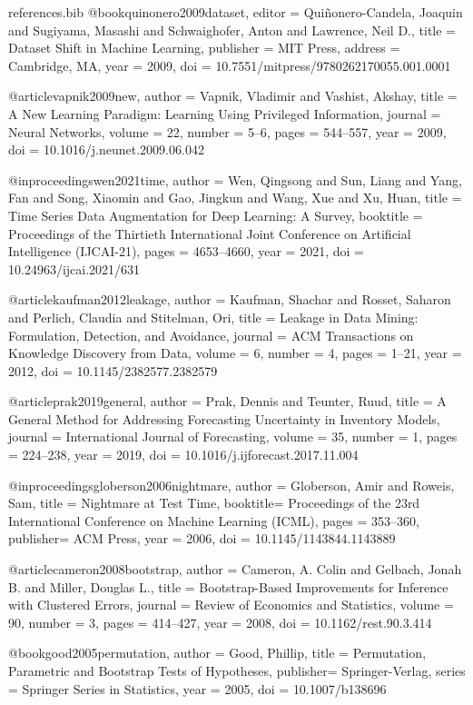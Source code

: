 \begin{filecontents*}{references.bib}
@book{quinonero2009dataset,
  editor    = {Qui{\~n}onero-Candela, Joaquin and Sugiyama, Masashi and Schwaighofer, Anton and Lawrence, Neil D.},
  title     = {Dataset Shift in Machine Learning},
  publisher = {MIT Press},
  address   = {Cambridge, MA},
  year      = {2009},
  doi       = {10.7551/mitpress/9780262170055.001.0001}
}

@article{vapnik2009new,
  author  = {Vapnik, Vladimir and Vashist, Akshay},
  title   = {A New Learning Paradigm: Learning Using Privileged Information},
  journal = {Neural Networks},
  volume  = {22},
  number  = {5--6},
  pages   = {544--557},
  year    = {2009},
  doi     = {10.1016/j.neunet.2009.06.042}
}

@inproceedings{wen2021time,
  author    = {Wen, Qingsong and Sun, Liang and Yang, Fan and Song, Xiaomin and Gao, Jingkun and Wang, Xue and Xu, Huan},
  title     = {Time Series Data Augmentation for Deep Learning: A Survey},
  booktitle = {Proceedings of the Thirtieth International Joint Conference on Artificial Intelligence ({IJCAI-21})},
  pages     = {4653--4660},
  year      = {2021},
  doi       = {10.24963/ijcai.2021/631}
}

@article{kaufman2012leakage,
  author  = {Kaufman, Shachar and Rosset, Saharon and Perlich, Claudia and Stitelman, Ori},
  title   = {Leakage in Data Mining: Formulation, Detection, and Avoidance},
  journal = {ACM Transactions on Knowledge Discovery from Data},
  volume  = {6},
  number  = {4},
  pages   = {1--21},
  year    = {2012},
  doi     = {10.1145/2382577.2382579}
}

@article{prak2019general,
  author  = {Prak, Dennis and Teunter, Ruud},
  title   = {A General Method for Addressing Forecasting Uncertainty in Inventory Models},
  journal = {International Journal of Forecasting},
  volume  = {35},
  number  = {1},
  pages   = {224--238},
  year    = {2019},
  doi     = {10.1016/j.ijforecast.2017.11.004}
}

@inproceedings{globerson2006nightmare,
  author  = {Globerson, Amir and Roweis, Sam},
  title   = {Nightmare at Test Time},
  booktitle= {Proceedings of the 23rd International Conference on Machine Learning (ICML)},
  pages   = {353--360},
  publisher= {ACM Press},
  year    = {2006},
  doi     = {10.1145/1143844.1143889}
}

@article{cameron2008bootstrap,
  author  = {Cameron, A. Colin and Gelbach, Jonah B. and Miller, Douglas L.},
  title   = {Bootstrap-Based Improvements for Inference with Clustered Errors},
  journal = {Review of Economics and Statistics},
  volume  = {90},
  number  = {3},
  pages   = {414--427},
  year    = {2008},
  doi     = {10.1162/rest.90.3.414}
}

@book{good2005permutation,
  author  = {Good, Phillip},
  title   = {Permutation, Parametric and Bootstrap Tests of Hypotheses},
  publisher= {Springer-Verlag},
  series  = {Springer Series in Statistics},
  year    = {2005},
  doi     = {10.1007/b138696}
}
\end{filecontents*}

